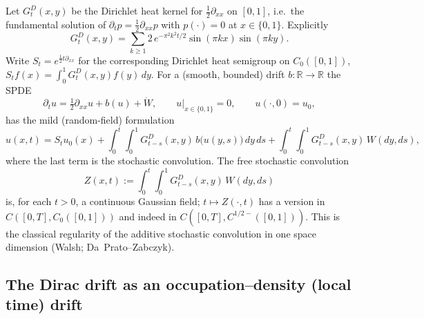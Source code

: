 \documentclass[11pt]{article}
\newcommand{\R}{\mathbb{R}}
\newcommand{\C}{C_0([0,1])}
\newcommand{\Wt}{\dot W}
\begin{document}
Let $G_t^D(x,y)$ be the Dirichlet heat kernel for $\tfrac12\partial_{xx}$ on
$[0,1]$, i.e.\ the fundamental solution of $\partial_t p=\tfrac12\partial_{xx}p$
with $p(\cdot)=0$ at $x\in\{0,1\}$. Explicitly
\[
G_t^D(x,y)=\sum_{k\ge1} 2\,e^{-\pi^2k^2 t/2}\sin(\pi k x)\sin(\pi k y).
\]
Write $S_t=e^{\frac12 t\partial_{xx}}$ for the corresponding Dirichlet heat
semigroup on $\C$, $S_tf(x)=\int_0^1 G^D_t(x,y)f(y)\,dy$. For a (smooth, bounded)
drift $b:\R\to\R$ the SPDE
\[
\partial_t u=\tfrac12\partial_{xx}u+b(u)+\Wt,\qquad u|_{x\in\{0,1\}}=0,\qquad
u(\cdot,0)=u_0,
\]
has the mild (random-field) formulation
\begin{equation}\label{eq:mild}
u(x,t)=S_t u_0(x)+\int_0^t\!\!\int_0^1 G^D_{t-s}(x,y)\,b\big(u(y,s)\big)\,dy\,ds
+\int_0^t\!\!\int_0^1 G^D_{t-s}(x,y)\,W(dy,ds),
\end{equation}
where the last term is the stochastic convolution. The free stochastic
convolution
\[
Z(x,t):=\int_0^t\!\!\int_0^1 G^D_{t-s}(x,y)\,W(dy,ds)
\]
is, for each $t>0$, a continuous Gaussian field; $t\mapsto Z(\cdot,t)$ has a
version in $C([0,T],\C)$ and indeed in
$C([0,T],C^{1/2-}([0,1]))$. This is the classical regularity of the additive
stochastic convolution in one space dimension (Walsh; Da~Prato--Zabczyk).

\subsection{The Dirac drift as an occupation--density (local time) drift}
\end{document}
